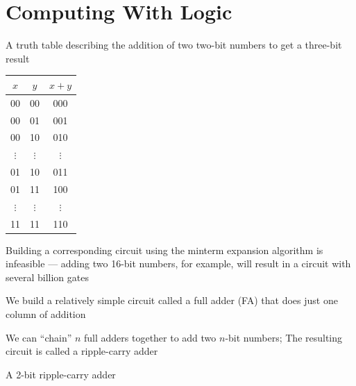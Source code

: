 \documentclass[8pt,a4paper,compress]{beamer}
\begin{document}
\section{Computing With Logic}
\begin{frame}[fragile]
\pause

A truth table describing the addition of two two-bit numbers to get a three-bit result
\begin{center}
\begin{tabular}{cc|c}
$x$ & $y$ & $x +y$ \\ \hline
00 & 00 & 000 \\
00 & 01 & 001 \\
00 & 10 & 010 \\
$\vdots$ & $\vdots$ & $\vdots$ \\
01 & 10 & 011 \\
01 & 11 & 100 \\
$\vdots$ & $\vdots$ & $\vdots$ \\
11 & 11 & 110
\end{tabular}
\end{center}

\pause
\bigskip

Building a corresponding circuit using the minterm expansion algorithm is infeasible --- adding two 16-bit numbers, for example, will result in a circuit with several billion gates
\end{frame}

\begin{frame}[fragile]
\pause

We build a relatively simple circuit called a full adder (FA) that does just one column of addition

\pause
\bigskip

We can ``chain'' $n$ full adders together to add two $n$-bit numbers;  The resulting circuit is called a ripple-carry adder

\pause
\bigskip

A 2-bit ripple-carry adder
\begin{center}
\end{center}
\end{frame}
\end{document}

